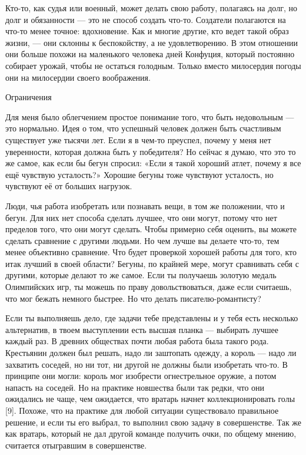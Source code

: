 \documentclass[ebook,12pt,oneside,openany]{memoir}
\begin{document}
Кто-то, как судья или военный, может делать свою работу, полагаясь на
долг, но долг и обязанности — это не способ создать что-то. Создатели
полагаются на что-то менее точное: вдохновение. Как и многие другие,
кто ведет такой образ жизни, — они склонны к беспокойству, а не
удовлетворению. В этом отношении они больше похожи на маленького
человека дней Конфуция, который постоянно собирает урожай, чтобы не
остаться голодным. Только вместо милосердия погоды они на милосердии
своего воображения.

Ограничения

Для меня было облегчением простое понимание того, что быть недовольным
— это нормально. Идея о том, что успешный человек должен быть
счастливым существует уже тысячи лет. Если я в чем-то преуспел, почему
у меня нет уверенности, которая должна быть у победителя? Но сейчас я
думаю, что это то же самое, как если бы бегун спросил: «Если я такой
хороший атлет, почему я все ещё чувствую усталость?» Хорошие бегуны
тоже чувствуют усталость, но чувствуют её от больших нагрузок.

Люди, чья работа изобретать или познавать вещи, в том же положении,
что и бегун. Для них нет способа сделать лучшее, что они могут, потому
что нет пределов того, что они могут сделать. Чтобы примерно себя
оценить, вы можете сделать сравнение с другими людьми. Но чем лучше вы
делаете что-то, тем менее объективно сравнение. Что будет проверкой
хорошей работы для того, кто итак лучший в своей области? Бегуны, по
крайней мере, могут сравнивать себя с другими, которые делают то же
самое. Если ты получаешь золотую медаль Олимпийских игр, ты можешь по
праву довольствоваться, даже если считаешь, что мог бежать немного
быстрее. Но что делать писателю-романтисту?

Если ты выполняешь дело, где задачи тебе представлены и у тебя есть
несколько альтернатив, в твоем выступлении есть высшая планка —
выбирать лучшее каждый раз. В древних обществах почти любая работа
была такого рода. Крестьянин должен был решать, надо ли заштопать
одежду, а король — надо ли захватить соседей, но ни тот, ни другой не
должны были изобретать что-то. В принципе они могли: король мог
изобрести огнестрельное оружие, а потом напасть на соседей. Но на
практике новшества были так редки, что они ожидались не чаще, чем
ожидается, что вратарь начнет коллекционировать голы [9]. Похоже, что
на практике для любой ситуации существовало правильное решение, и если
ты его выбрал, то выполнил свою задачу в совершенстве. Так же как
вратарь, который не дал другой команде получить очки, по общему
мнению, считается отыгравшим в совершенстве.
\end{document}
